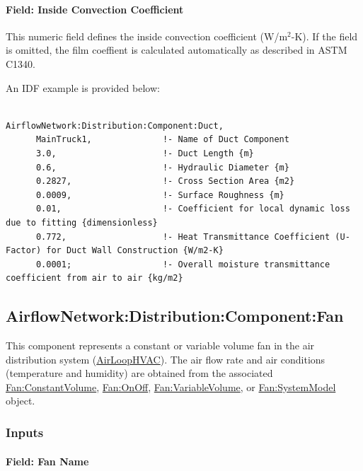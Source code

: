 \paragraph{Field: Inside Convection Coefficient}\label{field-inside-convection-coefficent}

This numeric field defines the inside convection coefficient (W/m\(^{2}\)-K). If the field is omitted, the film coeffient is calculated automatically as described in ASTM C1340.

An IDF example is provided below:

\begin{lstlisting}

AirflowNetwork:Distribution:Component:Duct,
      MainTruck1,              !- Name of Duct Component
      3.0,                     !- Duct Length {m}
      0.6,                     !- Hydraulic Diameter {m}
      0.2827,                  !- Cross Section Area {m2}
      0.0009,                  !- Surface Roughness {m}
      0.01,                    !- Coefficient for local dynamic loss due to fitting {dimensionless}
      0.772,                   !- Heat Transmittance Coefficient (U-Factor) for Duct Wall Construction {W/m2-K}
      0.0001;                  !- Overall moisture transmittance coefficient from air to air {kg/m2}
\end{lstlisting}

\subsection{AirflowNetwork:Distribution:Component:Fan}\label{airflownetworkdistributioncomponentfan}

This component represents a constant or variable volume fan in the air distribution system (\hyperref[airloophvac]{AirLoopHVAC}). The air flow rate and air conditions (temperature and humidity) are obtained from the associated \hyperref[fanconstantvolume]{Fan:ConstantVolume}, \hyperref[fanonoff]{Fan:OnOff}, \hyperref[fanvariablevolume]{Fan:VariableVolume}, or \hyperref[fansystemmodel]{Fan:SystemModel} object.

\subsubsection{Inputs}\label{inputs-16-001}

\paragraph{Field: Fan Name}\label{field-fan-name-000}

